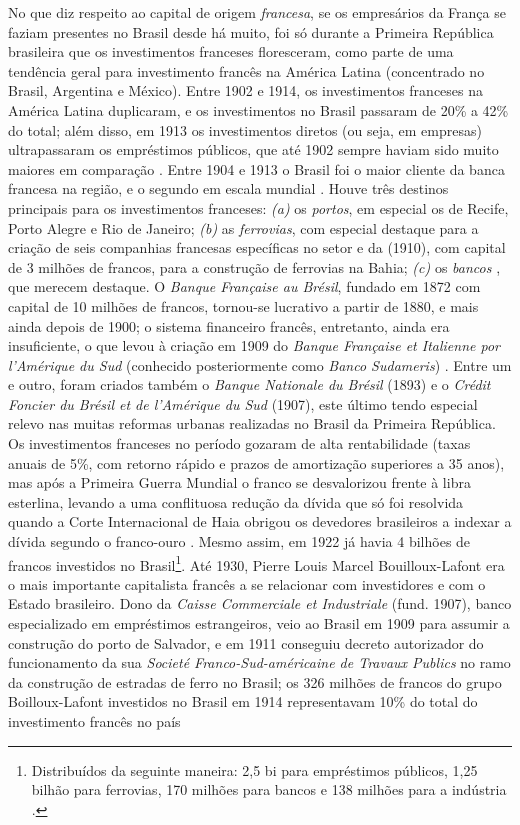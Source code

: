 No que diz respeito ao capital de origem \textit{francesa}, se os empresários da França se faziam presentes no Brasil desde há muito, foi só durante a Primeira República brasileira que os investimentos franceses floresceram, como parte de uma tendência geral para investimento francês na América Latina (concentrado no Brasil, Argentina e México). Entre 1902 e 1914, os investimentos franceses na América Latina duplicaram, e os investimentos no Brasil passaram de 20\% a 42\% do total; além disso, em 1913 os investimentos diretos (ou seja, em empresas) ultrapassaram os empréstimos públicos, que até 1902 sempre haviam sido muito maiores em comparação \cite[p~83-84]{mauro_empfran_1999}. Entre 1904 e 1913 o Brasil foi o maior cliente da banca francesa na região, e o segundo em escala mundial \cite{rippy_french_1949}. Houve três destinos principais para os investimentos franceses: \textit{(a)} os \textit{portos}, em especial os de Recife, Porto Alegre e Rio de Janeiro; \textit{(b)} as \textit{ferrovias}, com especial destaque para a criação de seis companhias francesas específicas no setor e da  (1910), com capital de 3 milhões de francos, para a construção de ferrovias na Bahia; \textit{(c)} os \textit{bancos} \cite[p~84]{mauro_empfran_1999}, que merecem destaque. O \textit{Banque Française au Brésil}, fundado em 1872 com capital de 10 milhões de francos, tornou-se lucrativo a partir de 1880, e mais ainda depois de 1900; o sistema financeiro francês, entretanto, ainda era insuficiente, o que levou à criação em 1909 do \textit{Banque Française et Italienne por l'Amérique du Sud} (conhecido posteriormente como \textit{Banco Sudameris}) \cite[p~84]{mauro_empfran_1999}. Entre um e outro, foram criados também o \textit{Banque Nationale du Brésil} (1893) e o \textit{Crédit Foncier du Brésil et de l'Amérique du Sud} (1907), este último tendo especial relevo nas muitas reformas urbanas realizadas no Brasil da Primeira República. Os investimentos franceses no período gozaram de alta rentabilidade (taxas anuais de 5\%, com retorno rápido e prazos de amortização superiores a 35 anos), mas após a Primeira Guerra Mundial o franco se desvalorizou frente à libra esterlina, levando a uma conflituosa redução da dívida que só foi resolvida quando a Corte Internacional de Haia obrigou os devedores brasileiros a indexar a dívida segundo o franco-ouro \cite[p.~87]{mauro_empfran_1999}. Mesmo assim, em 1922 já havia 4 bilhões de francos investidos no Brasil\footnote{Distribuídos da seguinte maneira: 2,5 bi para empréstimos públicos, 1,25 bilhão para ferrovias, 170 milhões para bancos e 138 milhões para a indústria \cite[p~84]{mauro_empfran_1999}.}. Até 1930, Pierre Louis Marcel Bouilloux-Lafont era o mais importante capitalista francês a se relacionar com investidores e com o Estado brasileiro. Dono da \textit{Caisse Commerciale et Industriale} (fund. 1907), banco especializado em empréstimos estrangeiros, veio ao Brasil em 1909 para assumir a construção do porto de Salvador, e em 1911 conseguiu decreto autorizador do funcionamento da sua \textit{Societé Franco-Sud-américaine de Travaux Publics} no ramo da construção de estradas de ferro no Brasil; os 326 milhões de francos do grupo Boilloux-Lafont investidos no Brasil em 1914 representavam 10\% do total do investimento francês no país 
